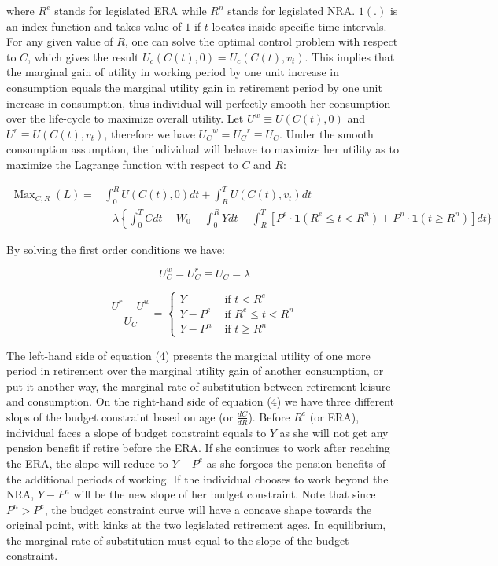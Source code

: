\documentclass[a4paper]{article}
\begin{document}
where $R^e$ stands for legislated ERA while $R^n$ stands for legislated NRA. $1(.)$ is an index function and takes value of $1$ if $t$ locates inside specific time intervals. For any given value of $R$, one can solve the optimal control problem with respect to $C$, which gives the result $U_c (C(t),0)=U_c (C(t),v_t )$. This implies that the marginal gain of utility in working period by one unit increase in consumption equals the marginal utility gain in retirement period by one unit increase in consumption, thus individual will perfectly smooth her consumption over the life-cycle to maximize overall utility.  Let $U^w≡U(C(t),0)$ and $U^r\equiv U(C(t),v_t )$, therefore we have ${U_C}^w={U_C}^r≡U_C$. Under the smooth consumption assumption, the individual will behave to maximize her utility as to maximize the Lagrange function with respect to $C$ and $R$: 

\begin{equation}
\begin{aligned} \operatorname{Max}_{C, R}(L)=& \int_{0}^{R} U(C(t), 0) d t+\int_{R}^{T} U\left(C(t), v_{t}\right) d t \\ &-\lambda\left\{\int_{0}^{T} C d t-W_{0}-\int_{0}^{R} Y d t\right.-\int_{R}^{T}\left[P^{e} \cdot \mathbf{1}\left(R^{e} \leq t<R^{n}\right)+P^{n} \cdot \mathbf{1}\left(t \geq R^{n}\right)\right] d t \} \end{aligned}
\end{equation}

By solving the first order conditions we have:

\begin{equation}
U_{C}^{w}=U_{C}^{r} \equiv U_{C}=\lambda
\end{equation}

\begin{equation}
\frac{U^{r}-U^{w}}{U_{C}}=\left\{\begin{array}{ll}{Y} & {\text { if } t<R^{e}} \\ {Y-P^{e}} & {\text { if } R^{e} \leq t<R^{n}} \\ {Y-P^{n}} & {\text { if } t \geq R^{n}}\end{array}\right.
\end{equation}

The left-hand side of equation (4) presents the marginal utility of one more period in retirement over the marginal utility gain of another consumption, or put it another way, the marginal rate of substitution between retirement leisure and consumption. On the right-hand side of equation (4) we have three different slops of the budget constraint based on age (or $\frac{dC}{dR}$). Before $R^e$ (or ERA), individual faces a slope of budget constraint equals to $Y$ as she will not get any pension benefit if retire before the ERA. If she continues to work after reaching the ERA, the slope will reduce to $Y-P^e$ as she forgoes the pension benefits of the additional periods of working. If the individual chooses to work beyond the NRA, $Y-P^n$ will be the new slope of her budget constraint. Note that since $P^n>P^e$, the budget constraint curve will have a concave shape towards the original point, with kinks at the two legislated retirement ages. In equilibrium, the marginal rate of substitution must equal to the slope of the budget constraint. 
\end{document}
